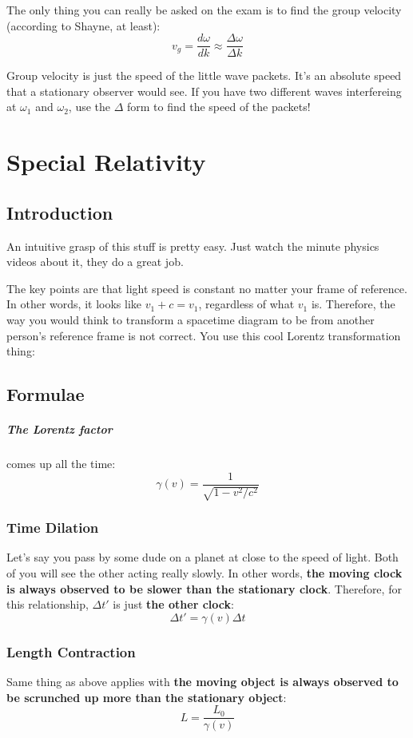 \documentclass[a4paper,12pt]{report}
\begin{document}
The only thing you can really be asked on the exam is to find the group velocity (according to Shayne, at least): 
$$v_g = \frac{d\omega}{dk} \approx \frac{\Delta \omega}{\Delta k}$$

Group velocity is just the speed of the little wave packets. It's an absolute speed that a stationary observer would see. If you have
two different waves interfereing at $\omega_1$ and $\omega_2$, use the $\Delta$ form to find the speed of the packets!

\chapter{Special Relativity}
\section{Introduction}
An intuitive grasp of this stuff is pretty easy. Just watch the minute physics videos about it, they do a great job.

The key points are that light speed is constant no matter your frame of reference. In other words, it looks like $v_1 + c = v_1$, 
regardless of what $v_1$ is. Therefore, the way you would think to transform a spacetime diagram to be from another person's 
reference frame is not correct. You use this cool Lorentz transformation thing:

\section{Formulae}
\paragraph{The Lorentz factor} comes up all the time: $$\gamma(v) = \frac{1}{\sqrt{1-v^2/c^2}}$$
\subsection{Time Dilation}
Let's say you pass by some dude on a planet at close to the speed of light. Both of you will see the other acting really slowly. In other 
words, \textbf{the moving clock is always observed to be slower than the stationary clock}. Therefore, for this relationship, $\Delta t'$ 
is just \textbf{the other clock}:
$$\Delta t' = \gamma(v)\Delta t$$

\subsection{Length Contraction}
Same thing as above applies with \textbf{the moving object is always observed to be scrunched up more than the stationary object}: 
$$L=\frac{L_0}{\gamma(v)}$$
\end{document}
